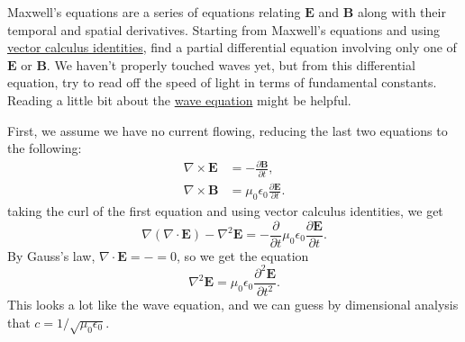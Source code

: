 \documentclass[11pt]{scrartcl}
\begin{document}
\begin{prob}
    Maxwell's equations are a series of equations relating $\mathbf E$ and $\mathbf B$ along with their temporal and spatial derivatives. Starting from Maxwell's equations and using \href{https://en.wikipedia.org/wiki/Vector_calculus_identities}{vector calculus identities}, find a partial differential equation involving only one of $\mathbf E$ or $\mathbf B$. We haven't properly touched waves yet, but from this differential equation, try to read off the speed of light in terms of fundamental constants. Reading a little bit about the \href{https://en.wikipedia.org/wiki/Wave_equation}{wave equation} might be helpful.
\end{prob}

\begin{sol}
    First, we assume we have no current flowing, reducing the last two equations to the following:
    \begin{align*}
        \nabla \times \mathbf E &= - \frac{\partial \mathbf B}{\partial t},\\
        \nabla \times \mathbf B &= \mu_0 \epsilon_0 \frac{\partial \mathbf E}{\partial t}.
    \end{align*}
    taking the curl of the first equation and using vector calculus identities, we get
    $$\nabla (\nabla \cdot \mathbf E) -\nabla^2 \mathbf E = -\frac{\partial}{\partial t}\mu_0\epsilon_0\frac{\partial \mathbf E}{\partial t}.$$
    By Gauss's law, $\nabla \cdot \mathbf E = -=0$, so we get the equation
    $$\nabla^2 \mathbf E = \mu_0\epsilon_0 \frac{\partial^2 \mathbf E}{\partial t^2}.$$
    This looks a lot like the wave equation, and we can guess by dimensional analysis that $c = 1/\sqrt{\mu_0\epsilon_0}.$
\end{sol}
\end{document}
